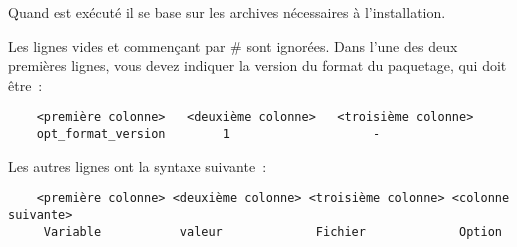     Quand  est exécuté il se base sur les archives nécessaires à l'installation.

    Les lignes vides et commençant par \og{}\#\fg{} sont ignorées. Dans l'une des deux premières
	lignes, vous devez indiquer la version du format du paquetage, qui doit être~:

\begin{example}
\begin{verbatim}
    <première colonne>   <deuxième colonne>   <troisième colonne>
    opt_format_version        1                    -
\end{verbatim}
\end{example}

    Les autres lignes ont la syntaxe suivante~:

\begin{example}
\begin{verbatim}
    <première colonne> <deuxième colonne> <troisième colonne> <colonne suivante>
     Variable           valeur             Fichier             Option
\end{verbatim}
\end{example}

